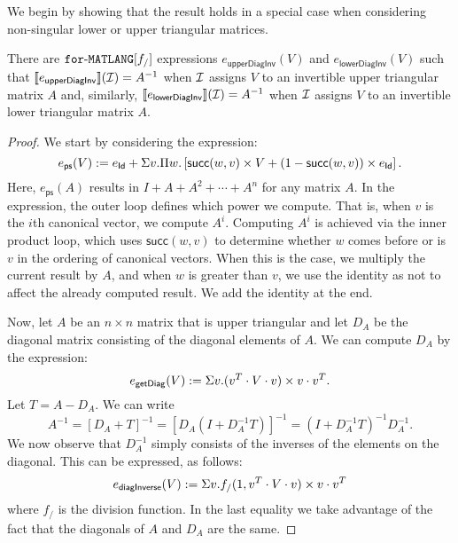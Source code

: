 
We begin by showing that the result holds in a special case when considering non-singular lower or upper triangular matrices.
\begin{lemma}\label{prop:upperlowerinverse}
There are $\texttt{for}\text{-}\texttt{MATLANG}[f_/]$ expressions $e_{\mathsf{upperDiagInv}}(V)$ and $e_{\mathsf{lowerDiagInv}}(V)$
such that $\llbracket e_{\mathsf{upperDiagInv}} \rrbracket(\mathcal{I})=A^{-1}$ when $\mathcal{I}$ assigns $V$
to an invertible upper triangular matrix $A$ and, similarly, $\llbracket e_{\mathsf{lowerDiagInv}} \rrbracket(\mathcal{I})=A^{-1}$ when $\mathcal{I}$ assigns $V$
to an invertible lower triangular matrix $A$.
\end{lemma}

\begin{proof} We start by considering the expression:
    $$
    e_{\mathsf{ps}}(V):= e_{\mathsf{Id}} + \Sigma v.\Pi w. \left[ \mathsf{succ}(w,v)\times V + (1 - \mathsf{succ}(w,v))\times e_{\mathsf{Id}} \right].
    $$
    Here, $e_{\mathsf{ps}}(A)$ results in $I+A+A^2+\cdots + A^n$ for any matrix $A$. In the expression, the outer loop defines which power we compute. 
    That is, when $v$ is the $i$th canonical vector, we compute $A^i$.
    Computing $A^i$ is achieved via the inner product loop, which uses $\mathsf{succ}(w,v)$ to 
    determine whether $w$ comes before or is $v$ in the ordering of canonical vectors.
    When this is the case, we multiply the current result by $A$, and when $w$ is greater 
    than $v$, we use the identity as not to affect the already computed result. We add the identity at the end.

    Now, let $A$ be an $n\times n$ matrix that is upper triangular and let $D_A$ be the diagonal matrix consisting of the diagonal elements of $A$.
    We can compute $D_A$ by the expression:
    $$
    e_{\mathsf{getDiag}}(V) := \Sigma v. (v^T\cdot V\cdot v) \times v\cdot v^T.
    $$
    Let $T=A-D_A$. We can write
    $$
    A^{-1}=\left[ D_A+T \right]^{-1}= \left[ D_A\left( I+D_A^{-1}T\right) \right]^{-1} = \left( I+D_A^{-1}T\right)^{-1}D_A^{-1}.
    $$
    We now observe that $D_{A}^{-1}$ simply consists of the inverses of the elements on the diagonal. This can be expressed, as follows:
    $$
    e_{\mathsf{diagInverse}}(V):=\Sigma v. f_{/}(1,v^T\cdot V\cdot v)\times v\cdot v^T
    $$
    where $f_{/}$ is the division function. In the last equality we take advantage of the fact that the diagonals of $A$ and $D_A$ are the same.


\end{proof}
